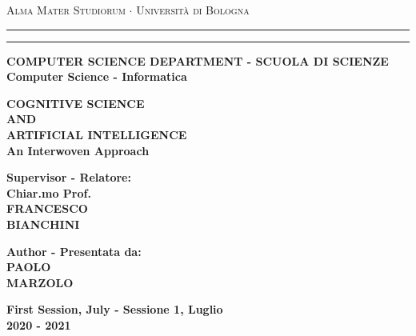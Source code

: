 \documentclass[../main.tex]{subfiles}
\begin{document}
\begin{titlepage}
    \begin{center}
        {{\Large{\textsc{Alma Mater Studiorum $\cdot$ Universit\`a di
                            Bologna}}}} \rule[0.1cm]{10cm}{0.1mm}
        \rule[0.5cm]{10cm}{0.6mm}


        {\small{\bf COMPUTER SCIENCE DEPARTMENT - SCUOLA DI SCIENZE\\
                Computer Science - Informatica}}
    \end{center}
    \vspace{12mm}
    \begin{center}
        {\LARGE{\bf COGNITIVE SCIENCE}}\\
        \vspace{3mm}
        {\LARGE{\bf AND}}\\
        \vspace{3mm}
        {\LARGE{\bf ARTIFICIAL INTELLIGENCE}}\\
        \vspace{7mm}
        {\LARGE{\bf An Interwoven Approach}}\\
    \end{center}
    \vspace{11mm}
    \par
    \noindent
    \begin{minipage}[t]{0.47\textwidth}
        {\large{\bf Supervisor - Relatore:\\
                Chiar.mo Prof.\\
                FRANCESCO \\ BIANCHINI}}
    \end{minipage}
    \hfill
    \begin{minipage}[t]{0.47\textwidth}\raggedleft
        {\large{\bf Author - Presentata da:\\
                PAOLO \\ MARZOLO}}
    \end{minipage}
    \vfill

    

    \vspace{1cm}

    \begin{center}
        {\large{\bf First Session, July - Sessione 1, Luglio\\
                2020 - 2021}}
    \end{center}
    \newpage

\end{titlepage}
\end{document}

